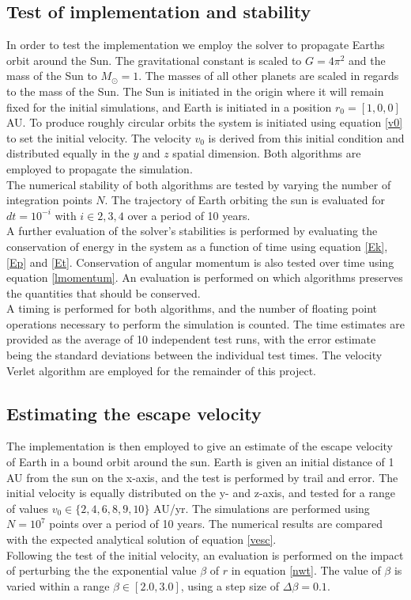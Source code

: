 \documentclass[%
reprint,nofootinbib,
amsmath,amssymb,
aps,
]{revtex4-1}
\begin{document}
\subsection{Test of implementation and stability} \noindent
In order to test the implementation we employ the solver to propagate Earths orbit around the Sun. The gravitational constant is scaled to $G = 4\pi^2$ and the mass of the Sun to $M_\odot = 1$. The masses of all other planets are scaled in regards to the mass of the Sun. The Sun is initiated in the origin where it will remain fixed for the initial simulations, and Earth is initiated in a position $r_0 = [1, 0, 0]$ AU. To produce roughly circular orbits the system is initiated using equation \ref{v0} to set the initial velocity. The velocity $v_0$ is derived from this initial condition and distributed equally in the $y$ and $z$ spatial dimension. Both algorithms are employed to propagate the simulation. \\ \indent 
The numerical stability of both algorithms are tested by varying the number of integration points $N$. The trajectory of Earth orbiting the sun is evaluated for $dt = 10^{-i}$ with $i\in{2,3,4}$ over a period of 10 years. \\ \indent 
A further evaluation of the solver's stabilities is performed by evaluating the conservation of energy in the system as a function of time using equation \ref{Ek}, \ref{Ep} and \ref{Et}. Conservation of angular momentum is also tested over time using equation \ref{lmomentum}. An evaluation is performed on which algorithms preserves the quantities that should be conserved. \\ \indent 
A timing is performed for both algorithms, and the number of floating point operations necessary to perform the simulation is counted. The time estimates are provided as the average of 10 independent test runs, with the error estimate being the standard deviations between the individual test times. The velocity Verlet algorithm are employed for the remainder of this project. \\ 

\subsection*{Estimating the escape velocity} \noindent 
The implementation is then employed to give an estimate of the escape velocity of Earth in a bound orbit around the sun. Earth is given an initial distance of 1 AU from the sun on the x-axis, and the test is performed by trail and error. The initial velocity is equally distributed on the y- and z-axis, and tested for a range of values $v_0\in\{2,4,6,8,9,10\}$ AU/yr.  The simulations are performed using $N=10^7$ points over a period of 10 years. The numerical results are compared with the expected analytical solution of equation \ref{vesc}. \\ \indent 
Following the test of the initial velocity, an evaluation is performed on the impact of perturbing the the exponential value $\beta$ of $r$ in equation \ref{nwt}. The value of  $\beta$ is varied within a range $\beta \in [2.0, 3.0]$, using a step size of $\Delta \beta = 0.1$. 
\end{document}
